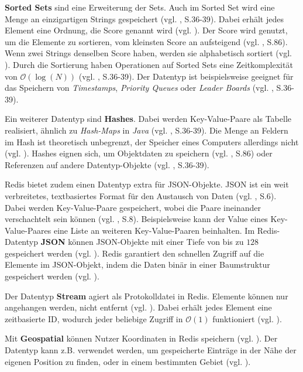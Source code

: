 \textbf{Sorted Sets} sind eine Erweiterung der Sets. Auch im Sorted Set wird eine Menge an einzigartigen Strings gespeichert (vgl. \cite{4}, S.36-39). Dabei erhält jedes Element eine Ordnung, die Score genannt wird (vgl. \cite{Redis-Docs-SoSe}). Der Score wird genutzt, um die Elemente zu sortieren, vom kleinsten Score an aufsteigend (vgl. \cite{nosql}, S.86). Wenn zwei Strings denselben Score haben, werden sie alphabetisch sortiert (vgl. \cite{Redis-Docs-SoSe}). Durch die Sortierung haben Operationen auf Sorted Sets eine Zeitkomplexität von $\mathcal{O}(\log(N))$ (vgl. \cite{4}, S.36-39). Der Datentyp ist beispielsweise geeignet für das Speichern von \textit{Timestamps}, \textit{Priority Queues} oder \textit{Leader Boards} (vgl. \cite{4}, S.36-39).

Ein weiterer Datentyp sind \textbf{Hashes}. Dabei werden Key-Value-Paare als Tabelle realisiert, ähnlich zu \textit{Hash-Maps} in \textit{Java} (vgl. \cite{4}, S.36-39). Die Menge an Feldern im Hash ist theoretisch unbegrenzt, der Speicher eines Computers allerdings nicht (vgl. \cite{Redis-Docs-Hash}). Hashes eignen sich, um Objektdaten zu speichern (vgl. \cite{nosql}, S.86) oder Referenzen auf andere Datentyp-Objekte (vgl. \cite{4}, S.36-39).

\ac{Redis} bietet zudem einen Datentyp extra für \ac{JSON}-Objekte. \ac{JSON} ist ein weit verbreitetes, textbasiertes Format für den Austausch von Daten (vgl. \cite{14}, S.6). Dabei werden Key-Value-Paare gespeichert, wobei die Paare ineinander verschachtelt sein können (vgl. \cite{14}, S.8). Beispielsweise kann der Value eines Key-Value-Paares eine Liste an weiteren Key-Value-Paaren beinhalten. Im \ac{Redis}-Datentyp \textbf{JSON} können \ac{JSON}-Objekte mit einer Tiefe von bis zu $128$ gespeichert werden (vgl. \cite{Redis-Docs-JSON}). \ac{Redis} garantiert den schnellen Zugriff auf die Elemente im \ac{JSON}-Objekt, indem die Daten binär in einer Baumstruktur gespeichert werden (vgl. \cite{Redis-Docs-JSON}).

Der Datentyp \textbf{Stream} agiert als Protokolldatei in \ac{Redis}. Elemente können nur angehangen werden, nicht entfernt (vgl. \cite{Redis-Docs-Stream}). Dabei erhält jedes Element eine zeitbasierte ID, wodurch jeder beliebige Zugriff in $\mathcal{O}(1)$ funktioniert (vgl. \cite{Redis-Docs-Stream}).

Mit \textbf{Geospatial} können Nutzer Koordinaten in \ac{Redis} speichern (vgl. \cite{Redis-Docs-Geospatial}). Der Datentyp kann z.B. verwendet werden, um gespeicherte Einträge in der Nähe der eigenen Position zu finden, oder in einem bestimmten Gebiet (vgl. \cite{Redis-Docs-Geospatial}).

